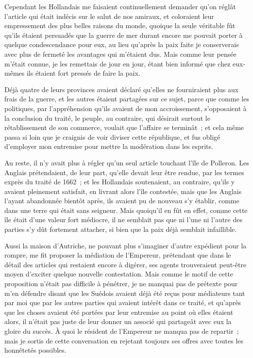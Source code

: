 \documentclass[french,twoside]{book} %
\begin{document}
Cependant les Hollandais me faisaient continuellement demander qu’on réglât l’article qui était indécis sur le salut de nos amiraux, et coloraient leur empressement des plus belles raisons du monde, quoique la seule véritable fût qu’ils étaient persuadés que la guerre de mer durant encore me pouvait porter à quelque condescendance pour eux, au lieu qu’après la paix faite je conserverais avec plus de fermeté les avantages qui m’étaient dus. Mais comme leur pensée m’était connue, je les remettais de jour en jour, étant bien informé que chez eux-mêmes ils étaient fort pressés de faire la paix.\par
Déjà quatre de leurs provinces avaient déclaré qu’elles ne fourniraient plus aux frais de la guerre, et les autres étaient partagées sur ce sujet, parce que comme les politiques, par l’appréhension qu’ils avaient de mon accroissement, s’opposaient à la conclusion du traité, le peuple, au contraire, qui désirait surtout le rétablissement de son commerce, voulait que l’affaire se terminât ; et cela même passa si loin que je craignis de voir diviser cette république, et fus obligé d’employer mon entremise pour mettre la modération dans les esprits.\par
Au reste, il n’y avait plus à régler qu’un seul article touchant l’île de Polleron. Les Anglais prétendaient, de leur part, qu’elle devait leur être rendue, par les termes exprès du traité de 1662 ; et les Hollandais soutenaient, au contraire, qu’ils y avaient pleinement satisfait, en livrant alors l’île contestée, mais que les Anglais l’ayant abandonnée bientôt après, ils avaient pu de nouveau s’y établir, comme dans une terre qui était sans seigneur. Mais quoiqu’il en fût en effet, comme cette île était d’une valeur fort médiocre, il ne semblait pas que ni l’une ni l’autre des parties s’y dût fortement attacher, si bien que la paix déjà semblait infaillible.\par
Aussi la maison d’Autriche, ne pouvant plus s’imaginer d’autre expédient pour la rompre, me fit proposer la médiation de l’Empereur, prétendant que dans le détail des articles qui restaient encore à digérer, ses agents trouveraient peut-être moyen d’exciter quelque nouvelle contestation. Mais comme le motif de cette proposition n’était pas difficile à pénétrer, je ne manquai pas de prétexte pour m’en défendre disant que les Suédois avaient déjà été reçus pour médiateurs tant par moi que par les autres parties qui avaient intérêt dans ce traité, et qu’après que les choses avaient été portées par leur entremise au point où elles étaient alors, il n’était pas juste de leur donner un associé qui partageât avec eux la gloire du succès. À quoi le résident de l’Empereur ne manqua pas de repartir ; mais je sortis de cette conversation en rejetant toujours ses offres avec toutes les honnêtetés possibles.\par
\end{document}
